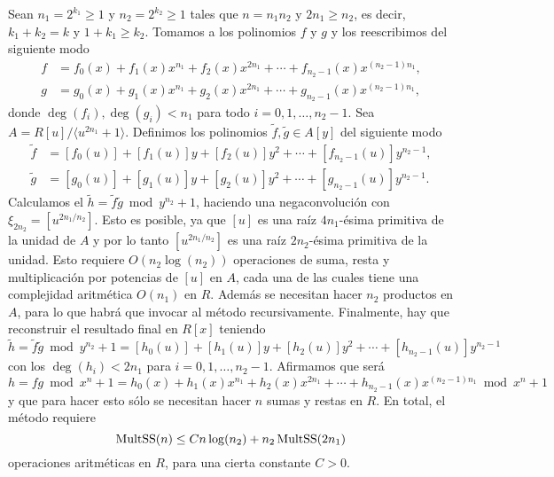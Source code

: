\documentclass[a4paper, 11pt]{article}
\theoremstyle{plain}
\theoremstyle{definition}
\begin{document}
Sean $n_1=2^{k_1}\geq1$ y $n_2=2^{k_2}\geq1$ tales que $n=n_1n_2$ y
$2n_1\geq n_2$, es decir, $k_1+k_2=k$ y $1+k_1\geq k_2$. Tomamos a los
polinomios $f$ y $g$ y los reescribimos del siguiente
modo
\[
\begin{aligned}
  f &= f_0(x) + f_1(x)x^{n_1}+ f_2(x)x^{2n_1}+\cdots +f_{n_2-1}(x)x^{(n_2-1)n_1}, \\
  g &= g_0(x) + g_1(x)x^{n_1}+ g_2(x)x^{2n_1}+\cdots +g_{n_2-1}(x)x^{(n_2-1)n_1},
\end{aligned}
\]
donde $\deg(f_i),\deg(g_i)<n_1$ para todo $i=0,1,\ldots,n_2-1$.
Sea $A=R[u]/\langle u^{2n_1}+1\rangle$. Definimos los polinomios $\tilde{f},
\tilde{g}\in A[y]$ del siguiente modo
\[
\begin{aligned}
  \tilde{f} &= [f_0(u)]+[f_1(u)]y+[f_2(u)]y^2+\cdots+[f_{n_2-1}(u)]y^{n_2-1}, \\
  \tilde{g} &= [g_0(u)]+[g_1(u)]y+[g_2(u)]y^2+\cdots+[g_{n_2-1}(u)]y^{n_2-1}.
\end{aligned}
\]
Calculamos el $\tilde{h}=\tilde{f}\tilde{g}\bmod{y^{n_2}+1}$, haciendo
una negaconvolución con $\xi_{2n_2}=[u^{2n_1/n_2}]$. Esto es posible, ya
que $[u]$ es una raíz $4n_1$-ésima primitiva de la unidad de $A$ y por
lo tanto $[u^{2n_1/n_2}]$ es una raíz $2n_2$-ésima primitiva de la unidad.
Esto requiere $O(n_2\log(n_2))$ operaciones de suma, resta y multiplicación
por potencias de $[u]$ en $A$, cada una de las cuales tiene una complejidad
aritmética $O(n_1)$ en $R$. Además se necesitan hacer $n_2$ productos en
$A$, para lo que habrá que invocar al método recursivamente.
Finalmente, hay que reconstruir el resultado final en $R[x]$ teniendo
\begin{equation}\label{zzz}
   \tilde{h}=\tilde{f}\tilde{g}\bmod{y^{n_2}+1}
   =[h_0(u)]+[h_1(u)]y+[h_2(u)]y^2+\cdots+[h_{n_2-1}(u)]y^{n_2-1}
\end{equation}
con los $\deg(h_i)<2n_1$ para $i=0,1,\ldots,n_2-1$.
Afirmamos que será
\begin{equation}\label{yyy}
   h=fg\bmod{x^n+1}=
   h_0(x)+h_1(x)x^{n_1}+h_2(x)x^{2n_1}+\cdots+h_{n_2-1}(x)x^{(n_2-1)n_1}
     \bmod{x^n+1}
\end{equation}
y que para hacer esto sólo se necesitan hacer $n$ sumas y restas en $R$.
En total, el método requiere
\begin{equation}\label{recSS}
  {\rm MultSS}(n)\leq Cn\log(n_2)+n_2\,{\rm MultSS}(2n_1)
\end{equation}
operaciones aritméticas en $R$, para una cierta constante $C>0$.

\bigskip
\end{document}
